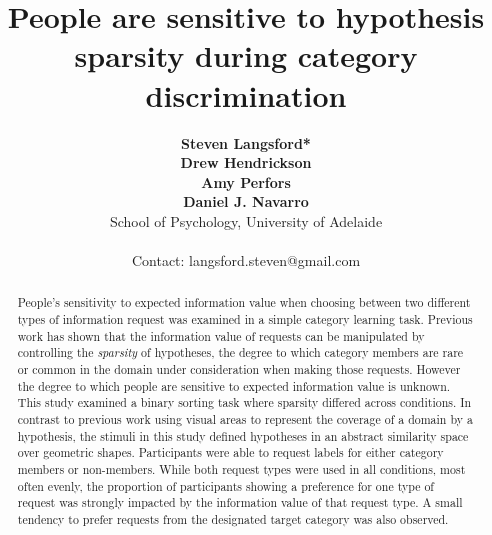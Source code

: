 \documentclass[a4paper, notitlepage]{article}%
\begin{document}
\title{People are sensitive to hypothesis sparsity during category discrimination}
\author{{\bf Steven Langsford*} \\
   	{\bf Drew Hendrickson} \\
	{\bf Amy Perfors} \\
   	{\bf Daniel J. Navarro}\\
   School of Psychology, University of Adelaide\\~\\Contact: langsford.steven@gmail.com}
\date{}

\maketitle
\thispagestyle{empty}
\pagestyle{empty}

\begin{abstract}
People's sensitivity to expected information value when choosing between two different types of information request was examined in a simple category learning task. Previous work has shown that the information value of requests can be manipulated by controlling the \textit{sparsity} of hypotheses, the degree to which category members are rare or common in the domain under consideration when making those requests. However the degree to which people are sensitive to expected information value is unknown. This study examined a binary sorting task where sparsity differed across conditions. In contrast to previous work using visual areas to represent the coverage of a domain by a hypothesis, the stimuli in this study defined hypotheses in an abstract similarity space over geometric shapes. Participants were able to request labels for either category members or non-members. While both request types were used in all conditions, most often evenly, the proportion of participants showing a preference for one type of request was strongly impacted by the information value of that request type. A small tendency to prefer requests from the designated target category was also observed.
\end{abstract}
\end{document}

